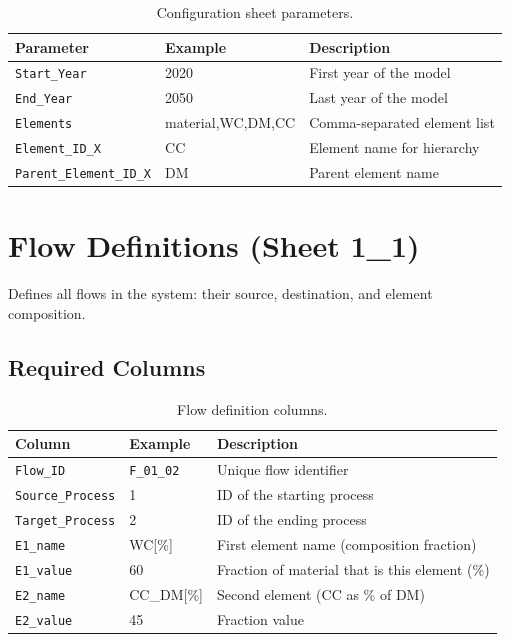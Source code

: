 \begin{table}[h]
\centering
\begin{tabular}{llp{6cm}}
\toprule
\textbf{Parameter} & \textbf{Example} & \textbf{Description} \\
\midrule
\texttt{Start\_Year} & 2020 & First year of the model \\
\texttt{End\_Year} & 2050 & Last year of the model \\
\texttt{Elements} & material,WC,DM,CC & Comma-separated element list \\
\texttt{Element\_ID\_X} & CC & Element name for hierarchy \\
\texttt{Parent\_Element\_ID\_X} & DM & Parent element name \\
\bottomrule
\end{tabular}
\caption{Configuration sheet parameters.}
\end{table}

\section{Flow Definitions (Sheet 1\_1)}

Defines all flows in the system: their source, destination, and element composition.

\subsection{Required Columns}

\begin{table}[h]
\centering
\begin{tabular}{llp{6cm}}
\toprule
\textbf{Column} & \textbf{Example} & \textbf{Description} \\
\midrule
\texttt{Flow\_ID} & \texttt{F\_01\_02} & Unique flow identifier \\
\texttt{Source\_Process} & 1 & ID of the starting process \\
\texttt{Target\_Process} & 2 & ID of the ending process \\
\texttt{E1\_name} & WC{[}\%{]} & First element name (composition fraction) \\
\texttt{E1\_value} & 60 & Fraction of material that is this element (\%) \\
\texttt{E2\_name} & CC\_DM{[}\%{]} & Second element (CC as \% of DM) \\
\texttt{E2\_value} & 45 & Fraction value \\
\bottomrule
\end{tabular}
\caption{Flow definition columns.}
\end{table}

